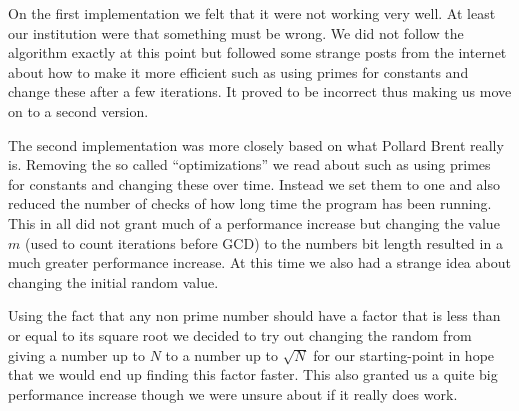 On the first implementation we felt that it were not working very well. At least our institution were that something must be wrong. We did not follow the algorithm exactly at this point but followed some strange posts from the internet about how to make it more efficient such as using primes for constants and change these after a few iterations. It proved to be incorrect thus making us move on to a second version.

The second implementation was more closely based on what Pollard Brent really is. Removing the so called “optimizations” we read about such as using primes for constants and changing these over time. Instead we set them to one and also reduced the number of checks of how long time the program has been running. This in all did not grant much of a performance increase but changing the value $m$ (used to count iterations before GCD) to the numbers bit length resulted in a much greater performance increase. At this time we also had a strange idea about changing the initial random value.

Using the fact that any non prime number should have a factor that is less than or equal to its square root we decided to try out changing the random from giving a number up to $N$ to a number up to $\sqrt{N}$ for our starting-point in hope that we would end up finding this factor faster. This also granted us a quite big performance increase though we were unsure about if it really does work.